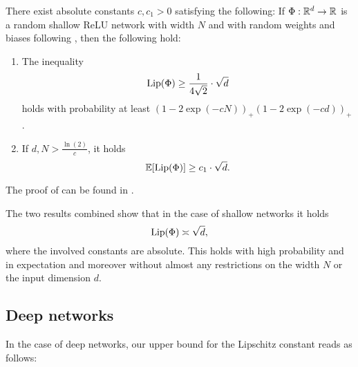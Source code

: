 \begin{theorem}\label{thm:main_shallow_lower}
  There exist absolute constants $c,c_1>0$ satisfying the following: If $\Phi: \mathbb{R}^d \to \mathbb{R}$ is a random shallow ReLU network with width $N$ and with random weights and biases following , then the following hold:
\begin{enumerate}
\item{The inequality
\begin{equation*}
\operatorname{Lip}(\Phi) \geq \frac{1}{4\sqrt{2}} \cdot \sqrt{d}
\end{equation*}
holds with probability at least $(1- 2 \exp(-cN))_+(1-2\exp(-cd))_+$.}
\item{ If $d,N > \frac{\ln(2)}{c}$, it holds
\begin{equation*}
\mathbb{E} [\operatorname{Lip}(\Phi)] \geq c_1 \cdot \sqrt{d}.
\end{equation*}
}
\end{enumerate}
\end{theorem}

The proof of  can be found in .


The two results combined show that in the case of shallow networks it holds
\begin{equation*}
  \operatorname{Lip}(\Phi) \asymp \sqrt{d},
\end{equation*}
where the involved constants are absolute.
This holds with high probability and in expectation and moreover
without almost any restrictions on the width $N$ or the input dimension $d$.

\subsection{Deep networks}

In the case of deep networks, our upper bound for the Lipschitz constant
reads as follows:

